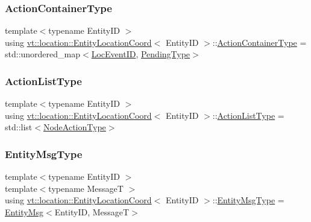 \subsubsection{\texorpdfstring{Action\+Container\+Type}{ActionContainerType}}
{\footnotesize\ttfamily template$<$typename Entity\+ID $>$ \\
using \hyperlink{structvt_1_1location_1_1_entity_location_coord}{vt\+::location\+::\+Entity\+Location\+Coord}$<$ Entity\+ID $>$\+::\hyperlink{structvt_1_1location_1_1_entity_location_coord_afeaaebfc1d7cbdd20cccbd348d96748a}{Action\+Container\+Type} =  std\+::unordered\+\_\+map$<$\hyperlink{namespacevt_1_1location_aa5ccc1a42aa22b0b41fcfbbdee314dca}{Loc\+Event\+ID}, \hyperlink{structvt_1_1location_1_1_entity_location_coord_a41b5c3792967e089c7e592b705c266c3}{Pending\+Type}$>$}

\mbox{\label{structvt_1_1location_1_1_entity_location_coord_a093712fbaa7584cb35db2b33514a719a}} 
\subsubsection{\texorpdfstring{Action\+List\+Type}{ActionListType}}
{\footnotesize\ttfamily template$<$typename Entity\+ID $>$ \\
using \hyperlink{structvt_1_1location_1_1_entity_location_coord}{vt\+::location\+::\+Entity\+Location\+Coord}$<$ Entity\+ID $>$\+::\hyperlink{structvt_1_1location_1_1_entity_location_coord_a093712fbaa7584cb35db2b33514a719a}{Action\+List\+Type} =  std\+::list$<$\hyperlink{namespacevt_1_1location_a3a9235e0ceb341bef225d2cc46606e9e}{Node\+Action\+Type}$>$}

\mbox{\label{structvt_1_1location_1_1_entity_location_coord_a69e037fef241a04659b4068c8ae1513f}} 
\subsubsection{\texorpdfstring{Entity\+Msg\+Type}{EntityMsgType}}
{\footnotesize\ttfamily template$<$typename Entity\+ID $>$ \\
template$<$typename MessageT $>$ \\
using \hyperlink{structvt_1_1location_1_1_entity_location_coord}{vt\+::location\+::\+Entity\+Location\+Coord}$<$ Entity\+ID $>$\+::\hyperlink{structvt_1_1location_1_1_entity_location_coord_a69e037fef241a04659b4068c8ae1513f}{Entity\+Msg\+Type} =  \hyperlink{structvt_1_1location_1_1_entity_msg}{Entity\+Msg}$<$Entity\+ID, MessageT$>$}

